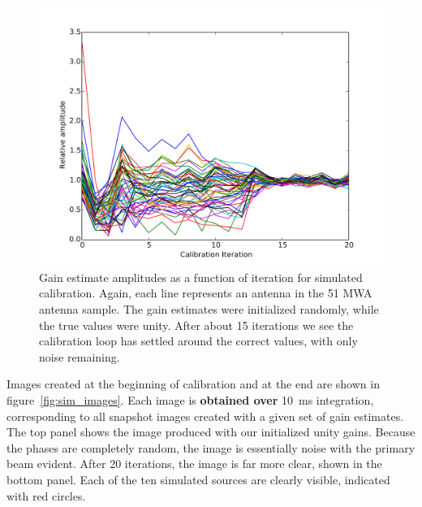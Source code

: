 \documentclass[a4paper,fleqn,usenatbib]{../mnras}
\begin{document}
\begin{figure}
\begin{center}
\includegraphics[width=\columnwidth]{figures/cal_paper_sim_amps.pdf}
\caption{Gain estimate amplitudes as a function of iteration for simulated calibration. Again, each line represents an antenna in the 51 MWA antenna sample. The gain estimates were initialized randomly, while the true values were unity. After about 15 iterations we see the calibration loop has settled around the correct values, with only noise remaining.}
\label{fig:sim_amp}
\end{center}
\end{figure}

Images created at the beginning of calibration and at the end are shown in figure~\ref{fig:sim_images}. Each image is {\bf obtained over} 10~ms integration, corresponding to all snapshot images created with a given set of gain estimates. The top panel shows the image produced with our initialized unity gains. Because the phases are completely random, the image is essentially noise with the primary beam evident. After 20 iterations, the image is far more clear, shown in the bottom panel. Each of the ten simulated sources are clearly visible, indicated with red circles. 
\end{document}
